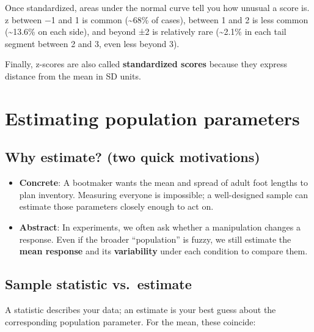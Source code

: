 \documentclass[
  letterpaper,
  DIV=11,
  numbers=noendperiod]{scrreprt}
\begin{document}
Once standardized, areas under the normal curve tell you how unusual a
score is. z between −1 and 1 is common (\textasciitilde68\% of cases),
between 1 and 2 is less common (\textasciitilde13.6\% on each side), and
beyond ±2 is relatively rare (\textasciitilde2.1\% in each tail segment
between 2 and 3, even less beyond 3).

Finally, z-scores are also called \textbf{standardized scores} because
they express distance from the mean in SD units.

\section{Estimating population
parameters}\label{estimating-population-parameters}

\subsection{Why estimate? (two quick
motivations)}\label{why-estimate-two-quick-motivations}

\begin{itemize}
\item
  \textbf{Concrete}: A bootmaker wants the mean and spread of adult foot
  lengths to plan inventory. Measuring everyone is impossible; a
  well-designed sample can estimate those parameters closely enough to
  act on.
\item
  \textbf{Abstract}: In experiments, we often ask whether a manipulation
  changes a response. Even if the broader ``population'' is fuzzy, we
  still estimate the \textbf{mean response} and its \textbf{variability}
  under each condition to compare them.
\end{itemize}

\subsection{Sample statistic
vs.~estimate}\label{sample-statistic-vs.-estimate}

A statistic describes your data; an estimate is your best guess about
the corresponding population parameter. For the mean, these coincide:
\end{document}
